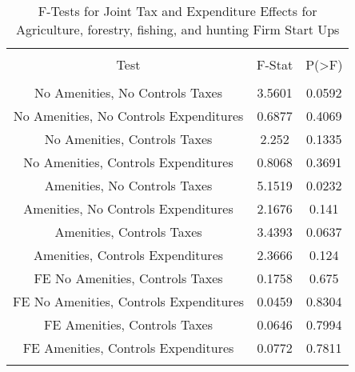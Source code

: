 
\begin{table}[!htbp] \centering 
  \caption{F-Tests for Joint Tax and Expenditure Effects for Agriculture, forestry, fishing, and hunting Firm Start Ups} 
  \label{11Ftests} 
\begin{tabular}{@{\extracolsep{5pt}} ccc} 
\\[-1.8ex]\hline 
\hline \\[-1.8ex] 
Test & F-Stat & P(\textgreater F) \\ 
\hline \\[-1.8ex] 
No Amenities, No Controls Taxes & 3.5601 & 0.0592 \\ 
No Amenities, No Controls Expenditures & 0.6877 & 0.4069 \\ 
No Amenities, Controls Taxes & 2.252 & 0.1335 \\ 
No Amenities, Controls Expenditures & 0.8068 & 0.3691 \\ 
Amenities, No Controls Taxes & 5.1519 & 0.0232 \\ 
Amenities, No Controls Expenditures & 2.1676 & 0.141 \\ 
Amenities, Controls Taxes & 3.4393 & 0.0637 \\ 
Amenities, Controls Expenditures & 2.3666 & 0.124 \\ 
FE No Amenities, Controls Taxes & 0.1758 & 0.675 \\ 
FE No Amenities, Controls Expenditures & 0.0459 & 0.8304 \\ 
FE Amenities, Controls Taxes & 0.0646 & 0.7994 \\ 
FE Amenities, Controls Expenditures & 0.0772 & 0.7811 \\ 
\hline \\[-1.8ex] 
\end{tabular} 
\end{table} 
